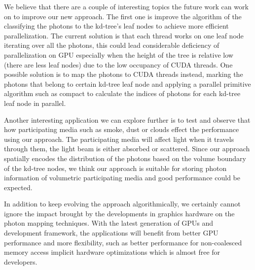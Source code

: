 We believe that there are a couple of interesting topics the future work can work on to improve our new approach. The first one is improve the algorithm of the classifying the photons to the kd-tree's leaf nodes to achieve more efficient parallelization. The current solution is that each thread works on one leaf node iterating over all the photons, this could lead considerable deficiency of parallelization on GPU especially when the height of the tree is relative low (there are less leaf nodes) due to the low occupancy of CUDA threads. One possible solution is to map the photons to CUDA threads instead, marking the photons that belong  to certain kd-tree leaf node and applying a parallel primitive algorithm such as compact to calculate the indices of photons for each kd-tree leaf node in parallel.

Another interesting application we can explore further is to test and observe that how participating media such as smoke, dust or clouds effect the performance using our approach. The participating media will affect light when it travels through them, the light beam is either absorbed or scattered. Since our approach spatially encodes the distribution of the photons based on the volume boundary of the kd-tree nodes, we think our approach is suitable for storing photon information of volumetric participating media and good performance could be expected.

In addition to keep evolving the approach algorithmically, we certainly cannot ignore the impact brought by the developments in graphics hardware on the photon mapping techniques. With the latest generation of GPUs and development framework, the applications will benefit from better GPU performance and more flexibility, such as better performance for non-coalesced memory access implicit hardware optimizations which is almost free for developers. 